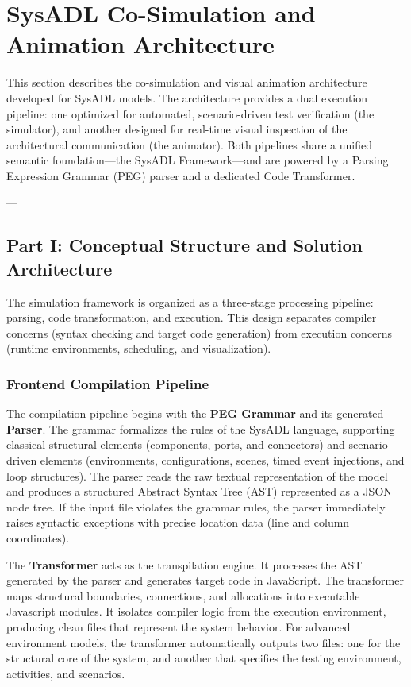 \section{SysADL Co-Simulation and Animation Architecture}

This section describes the co-simulation and visual animation architecture developed for SysADL models. The architecture provides a dual execution pipeline: one optimized for automated, scenario-driven test verification (the simulator), and another designed for real-time visual inspection of the architectural communication (the animator). Both pipelines share a unified semantic foundation—the SysADL Framework—and are powered by a Parsing Expression Grammar (PEG) parser and a dedicated Code Transformer.

---

\subsection{Part I: Conceptual Structure and Solution Architecture}

The simulation framework is organized as a three-stage processing pipeline: parsing, code transformation, and execution. This design separates compiler concerns (syntax checking and target code generation) from execution concerns (runtime environments, scheduling, and visualization).

\subsubsection{Frontend Compilation Pipeline}
The compilation pipeline begins with the \textbf{PEG Grammar} and its generated \textbf{Parser}. The grammar formalizes the rules of the SysADL language, supporting classical structural elements (components, ports, and connectors) and scenario-driven elements (environments, configurations, scenes, timed event injections, and loop structures). The parser reads the raw textual representation of the model and produces a structured Abstract Syntax Tree (AST) represented as a JSON node tree. If the input file violates the grammar rules, the parser immediately raises syntactic exceptions with precise location data (line and column coordinates).

The \textbf{Transformer} acts as the transpilation engine. It processes the AST generated by the parser and generates target code in JavaScript. The transformer maps structural boundaries, connections, and allocations into executable Javascript modules. It isolates compiler logic from the execution environment, producing clean files that represent the system behavior. For advanced environment models, the transformer automatically outputs two files: one for the structural core of the system, and another that specifies the testing environment, activities, and scenarios.

